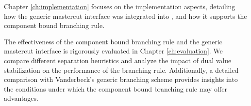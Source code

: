 Chapter \ref{ch:implementation} focuses on the implementation aspects, detailing how the generic mastercut interface was integrated into \GCG{}, and how it supports the component bound branching rule.

The effectiveness of the component bound branching rule and the generic mastercut interface is rigorously evaluated in Chapter \ref{ch:evaluation}. We compare different separation heuristics and analyze the impact of dual value stabilization on the performance of the branching rule. Additionally, a detailed comparison with Vanderbeck's generic branching scheme provides insights into the conditions under which the component bound branching rule may offer advantages.
